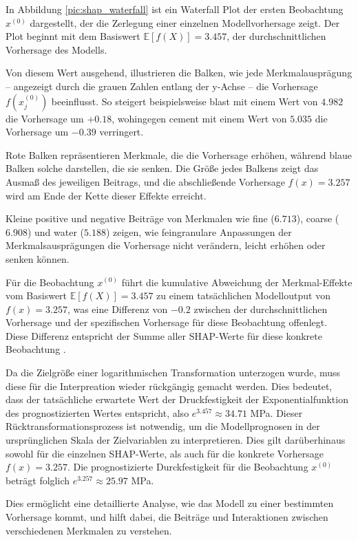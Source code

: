 In Abbildung \ref{pic:shap_waterfall} ist ein Waterfall Plot der ersten Beobachtung $x^{(0)}$ dargestellt, 
der die Zerlegung einer einzelnen Modellvorhersage zeigt. Der Plot beginnt mit dem Basiswert $\mathbb{E}[f(X)] = 3.457$, 
der durchschnittlichen Vorhersage des Modells. 

Von diesem Wert ausgehend, illustrieren die Balken, wie jede Merkmalausprägung – 
angezeigt durch die grauen Zahlen entlang der y-Achse – die Vorhersage $f(x_{j}^{(0)})$ beeinflusst. 
So steigert beispielsweise blast mit einem Wert von $4.982$ die Vorhersage um $+0.18$, 
wohingegen cement mit einem Wert von $5.035$ die Vorhersage um $-0.39$ verringert.

Rote Balken repräsentieren Merkmale, die die Vorhersage erhöhen, während blaue Balken solche 
darstellen, die sie senken. Die Größe jedes Balkens zeigt das Ausmaß des jeweiligen Beitrags, 
und die abschließende Vorhersage $f(x) = 3.257$ wird am Ende der Kette dieser Effekte erreicht. 

Kleine positive und negative Beiträge von Merkmalen wie fine ($6.713$), coarse ($6.908$) und water ($5.188$)
zeigen, wie feingranulare Anpassungen der Merkmalsausprägungen die Vorhersage nicht verändern, leicht erhöhen oder senken können.

Für die Beobachtung $x^{(0)}$ führt die kumulative Abweichung der Merkmal-Effekte 
vom Basiswert $\mathbb{E}[f(X)] = 3.457$ zu einem tatsächlichen Modelloutput von $f(x) = 3.257$, 
was eine Differenz von $-0.2$ zwischen der durchschnittlichen Vorhersage 
und der spezifischen Vorhersage für diese Beobachtung offenlegt. 
Diese Differenz entspricht der Summe aller SHAP-Werte für diese konkrete Beobachtung \cite[S. 52f]{Molnar_2023}.

Da die Zielgröße einer logarithmischen Transformation unterzogen wurde, muss diese für die Interpreation wieder rückgängig gemacht werden. 
Dies bedeutet, dass der tatsächliche erwartete Wert der Druckfestigkeit der Exponentialfunktion des prognostizierten Wertes entspricht, also $e^{3.457} \approx 34.71$ MPa. 
Dieser Rücktransformationsprozess ist notwendig, um die Modellprognosen in der ursprünglichen Skala der Zielvariablen zu interpretieren.
Dies gilt darüberhinaus sowohl für die einzelnen SHAP-Werte, als auch für die konkrete Vorhersage $f(x) = 3.257$. 
Die prognostizierte Durckfestigkeit für die Beobachtung $x^{(0)}$ beträgt folglich $e^{3.257} \approx 25.97$ MPa.

Dies ermöglicht eine detaillierte Analyse, wie das Modell zu einer bestimmten Vorhersage kommt, 
und hilft dabei, die Beiträge und Interaktionen zwischen verschiedenen Merkmalen zu verstehen.

